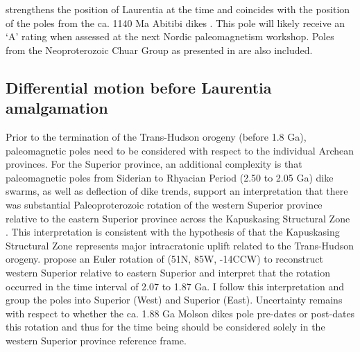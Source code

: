 \documentclass[11pt,letterpaper]{article}
\begin{document}
strengthens the position of Laurentia at the time and coincides with the position of the poles from the ca. 1140 Ma Abitibi dikes \citep{Ernst1993a}. This pole will likely receive an `A' rating when assessed at the next Nordic paleomagnetism workshop. Poles from the Neoproterozoic Chuar Group as presented in \cite{Eyster2019a} are also included. 

\subsection{Differential motion before Laurentia amalgamation}

Prior to the termination of the Trans-Hudson orogeny (before 1.8 Ga), paleomagnetic poles need to be considered with respect to the individual Archean provinces. For the Superior province, an additional complexity is that paleomagnetic poles from Siderian to Rhyacian Period (2.50 to 2.05 Ga) dike swarms, as well as deflection of dike trends, support an interpretation that there was substantial Paleoproterozoic rotation of the western Superior province relative to the eastern Superior province across the Kapuskasing Structural Zone \citep{Bates1991a, Evans2010a}. This interpretation is consistent with the hypothesis of \citet{Hoffman1988a} that the Kapuskasing Structural Zone represents major intracratonic uplift related to the Trans-Hudson orogeny. \cite{Evans2010a} propose an Euler rotation of (51\textdegree N, 85\textdegree W, -14\textdegree CCW) to reconstruct western Superior relative to eastern Superior and interpret that the rotation occurred in the time interval of 2.07 to 1.87 Ga.  I follow this interpretation and group the poles into Superior (West) and Superior (East).  Uncertainty remains with respect to whether the ca. 1.88 Ga Molson dikes pole pre-dates or post-dates this rotation \citep{Evans2010a} and thus for the time being should be considered solely in the western Superior province reference frame. 
\end{document}
